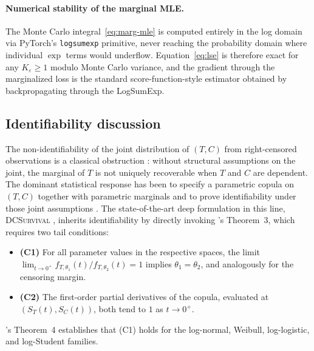 \paragraph{Numerical stability of the marginal MLE.}
The Monte Carlo integral~\eqref{eq:marg-mle} is computed entirely in the
log domain via PyTorch's \texttt{logsumexp} primitive, never reaching the
probability domain where individual $\exp$ terms would underflow.
Equation~\eqref{eq:lse} is therefore exact for any $K_\varepsilon \ge 1$
modulo Monte Carlo variance, and the gradient through the marginalized
loss is the standard score-function-style estimator obtained by
backpropagating through the LogSumExp.

\subsection{Identifiability discussion}
\label{sec:identifiability}

The non-identifiability of the joint distribution of $(T, C)$ from
right-censored observations is a classical obstruction
\citep{tsiatis1975nonidentifiability}: without structural assumptions on
the joint, the marginal of $T$ is not uniquely recoverable when $T$ and
$C$ are dependent. The dominant statistical response has been to specify
a parametric copula on $(T, C)$ together with parametric marginals and to
prove identifiability under those joint assumptions
\citep{czado2023dependent,deresa2021semiparametric}. The state-of-the-art
deep formulation in this line, \textsc{DCSurvival} \citep{zhang2024deepcopula},
inherits identifiability by directly invoking
\citet{czado2023dependent}'s Theorem~3, which requires two tail conditions:
\begin{itemize}
    \item \textbf{(C1)} For all parameter values in the respective spaces,
        the limit
        $\displaystyle \lim_{t \to 0^+} f_{T,\theta_1}(t) / f_{T,\theta_2}(t) = 1$
        implies $\theta_1 = \theta_2$, and analogously for the censoring
        margin.
    \item \textbf{(C2)} The first-order partial derivatives of the copula,
        evaluated at $(S_T(t), S_C(t))$, both tend to $1$ as $t \to 0^+$.
\end{itemize}
\citet{czado2023dependent}'s Theorem~4 establishes that (C1) holds for the
log-normal, Weibull, log-logistic, and log-Student families.

